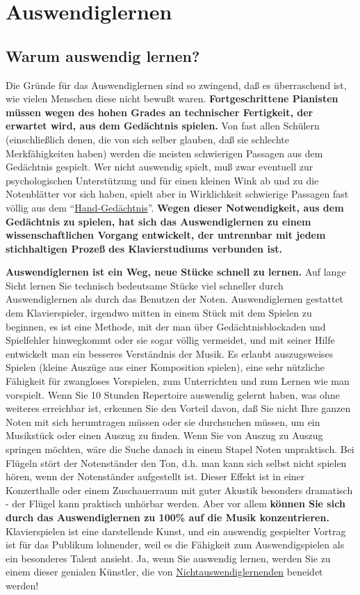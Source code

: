 
\section{Auswendiglernen}\hypertarget{c1iii6}{} 

\subsection{Warum auswendig lernen?}\hypertarget{c1iii6a}{}

Die Gründe für das Auswendiglernen sind so zwingend, daß es überraschend ist, wie vielen Menschen diese nicht bewußt waren.
\textbf{Fortgeschrittene Pianisten müssen wegen des hohen Grades an technischer Fertigkeit, der erwartet wird, aus dem Gedächtnis spielen.}
Von fast allen Schülern (einschließlich denen, die von sich selber glauben, daß sie schlechte Merkfähigkeiten haben) werden die meisten schwierigen Passagen aus dem Gedächtnis gespielt.
Wer nicht auswendig spielt, muß zwar eventuell zur psychologischen Unterstützung und für einen kleinen Wink ab und zu die Notenblätter vor sich haben, spielt aber in Wirklichkeit schwierige Passagen fast völlig aus dem \enquote{\hyperlink{c1iii6d}{Hand-Gedächtnis}}.
\textbf{Wegen dieser Notwendigkeit, aus dem Gedächtnis zu spielen, hat sich das Auswendiglernen zu einem wissenschaftlichen Vorgang entwickelt, der untrennbar mit jedem stichhaltigen Prozeß des Klavierstudiums verbunden ist.}

\textbf{Auswendiglernen ist ein Weg, neue Stücke schnell zu lernen.}
Auf lange Sicht lernen Sie technisch bedeutsame Stücke viel schneller durch Auswendiglernen als durch das Benutzen der Noten.
Auswendiglernen gestattet dem Klavierspieler, irgendwo mitten in einem Stück mit dem Spielen zu beginnen, es ist eine Methode, mit der man über Gedächtnisblockaden und Spielfehler hinwegkommt oder sie sogar völlig vermeidet, und  mit seiner Hilfe entwickelt man ein besseres Verständnis der Musik.
Es erlaubt auszugsweises Spielen (kleine Auszüge aus einer Komposition spielen), eine sehr nützliche Fähigkeit für zwangloses Vorspielen, zum Unterrichten und zum Lernen wie man vorspielt.
Wenn Sie 10 Stunden Repertoire auswendig gelernt haben, was ohne weiteres erreichbar ist, erkennen Sie den Vorteil davon, daß Sie nicht Ihre ganzen Noten mit sich herumtragen müssen oder sie durchsuchen müssen, um ein Musikstück oder einen Auszug zu finden.
Wenn Sie von Auszug zu Auszug springen möchten, wäre die Suche danach in einem Stapel Noten unpraktisch.
Bei Flügeln stört der Notenständer den Ton, d.h. man kann sich selbst nicht spielen hören, wenn der Notenständer aufgestellt ist.
Dieser Effekt ist in einer Konzerthalle oder einem Zuschauerraum mit guter Akustik besonders dramatisch - der Flügel kann praktisch unhörbar werden.
Aber vor allem \textbf{können Sie sich durch das Auswendiglernen zu 100\% auf die Musik konzentrieren.}
Klavierspielen ist eine darstellende Kunst, und ein auswendig gespielter Vortrag ist für das Publikum lohnender, weil es die Fähigkeit zum Auswendigspielen als ein besonderes Talent ansieht.
Ja, wenn Sie auswendig lernen, werden Sie zu einem dieser genialen Künstler, die von \hyperlink{memorizer}{Nichtauswendiglernenden} beneidet werden!

